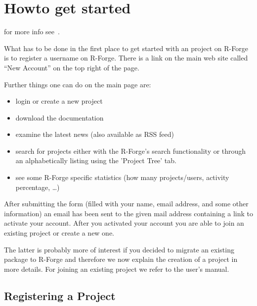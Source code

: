 


\section{Howto get started}

for more info see~\cite{theussl07:r_forge_users_manual}.

What has to be done in the first place to get started with an project
on R-Forge is to register a username on R-Forge. There is a link on
the main web site called ``New Account'' on the top right of the page.

Further things one can do on the main page are:

\begin{itemize}
\item login or create a new project
\item download the documentation
\item examine the latest news (also available as RSS feed)
\item search for projects either with the R-Forge's search
  functionality or through an 
  alphabetically listing using the 'Project Tree' tab. 
\item see some R-Forge specific statistics (how many projects/users,
  activity percentage, \ldots{})
\end{itemize}

After submitting the form (filled with your name, email address, and
some other information) an email has been sent to the given mail
address containing a link to activate your account. After you
activated your account you are able to join an existing project or
create a new one.

The latter is probably more of interest if you decided to migrate an
existing package to R-Forge and therefore we now explain the creation
of a project in more details. For joining an existing project we refer
to the user's manual.

\subsection{Registering a Project}

